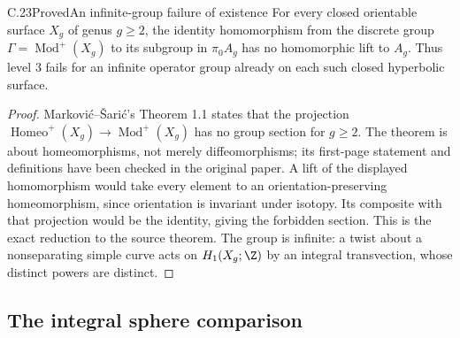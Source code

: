 \begin{claim}{C.23}{Proved}{An infinite-group failure of existence}
For every closed orientable surface $X_g$ of genus $g\geq2$, the
identity homomorphism from the discrete group
$\Gamma=\operatorname{Mod}^+(X_g)$ to its subgroup in $\pi_0A_g$
has no homomorphic lift to $A_g$. Thus level $3$ fails for an infinite
operator group already on each such closed hyperbolic surface.
\end{claim}
\begin{proof}
Markovi\'c--\v Sari\'c's Theorem 1.1
\cite{C_MarkovicSaric2008} states that the projection
$\operatorname{Homeo}^+(X_g)\to\operatorname{Mod}^+(X_g)$ has no group
section for $g\geq2$. The theorem is about homeomorphisms, not merely
diffeomorphisms; its first-page statement and definitions have been
checked in the original paper. A lift of the displayed homomorphism
would take every element to an orientation-preserving homeomorphism,
since orientation is invariant under isotopy. Its composite with that
projection would be the identity, giving the forbidden section. This
is the exact reduction to the source theorem. The group is infinite:
a twist about a nonseparating simple curve acts on $H_1(X_g;\Z)$ by
an integral transvection, whose distinct powers are distinct.
\end{proof}

\subsection{The integral sphere comparison}

